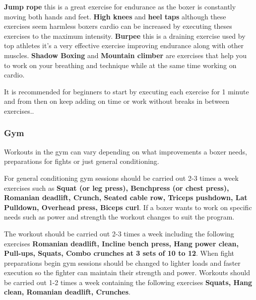 \documentclass[a4paper,12pt]{report}
\begin{document}
\textbf{Jump rope} this is a great exercise for endurance as the boxer is constantly moving both hands and feet. \textbf{High knees} and \textbf{heel taps} although these exercises seem harmless boxers cardio can be increased by executing theses exercises to the maximum intensity. \textbf{Burpee} this is a draining exercise used by top athletes it's a very effective exercise improving endurance along with other muscles. \textbf{Shadow Boxing} and \textbf{Mountain climber} are exercises that help you to work on your breathing and technique while at the same time working on cardio.

It is recommended for beginners to start by executing each exercise for 1 minute and from then on keep adding on time or work without breaks in between exercises.\cite{cardioWorkout}.\\

\subsubsection{Gym}
Workouts in the gym can vary depending on what improvements a boxer needs, preparations for fights or just general conditioning.

For general conditioning gym sessions should be carried out 2-3 times a week exercises such as \textbf{Squat (or leg press), Benchpress (or chest press), Romanian deadlift, Crunch, Seated cable row, Triceps pushdown, Lat Pulldown, Overhead press, Biceps curl}. If a boxer wants to work on specific needs such as power and strength the workout changes to suit the program.

The workout should be carried out 2-3 times a week including the following exercises \textbf{Romanian deadlift, Incline bench press, Hang power clean, Pull-ups, Squats, Combo crunches at 3 sets of 10 to 12}. When fight preparations begin gym sessions should be changed to lighter loads and faster execution so the fighter can maintain their strength and power.
Workouts should be carried out 1-2 times a week containing the following exercises \textbf{Squats, Hang clean, Romanian deadlift, Crunches}.\cite{gymWorkout}
\end{document}
